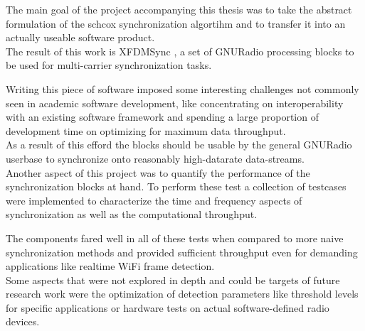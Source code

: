 The main goal of the project accompanying this thesis was
to take the abstract formulation of the \acrlong{schcox}
synchronization algortihm and to transfer it into an actually
useable software product. \\

The result of this work is XFDMSync \cite{xfdmsyncweb},
a set of GNURadio processing blocks to be used for multi-carrier
synchronization tasks.

Writing this piece of software imposed some interesting
challenges not commonly seen in academic software development,
like concentrating on interoperability with an existing
software framework and spending a large proportion of
development time on optimizing for maximum data throughput. \\

As a result of this efford the blocks should be usable
by the general GNURadio userbase to synchronize onto
reasonably high-datarate data-streams. \\

Another aspect of this project was to quantify
the performance of the synchronization blocks at hand.
To perform these test a collection of testcases
were implemented to characterize the
time and frequency aspects of synchronization as
well as the computational throughput.

The components fared well in all of these tests
when compared to more naive synchronization
methods and provided sufficient throughput
even for demanding applications like realtime WiFi frame
detection. \\

Some aspects that were not explored in depth
and could be targets of future research work
were the optimization of detection parameters
like threshold levels for specific applications
or hardware tests on actual software-defined radio
devices.
